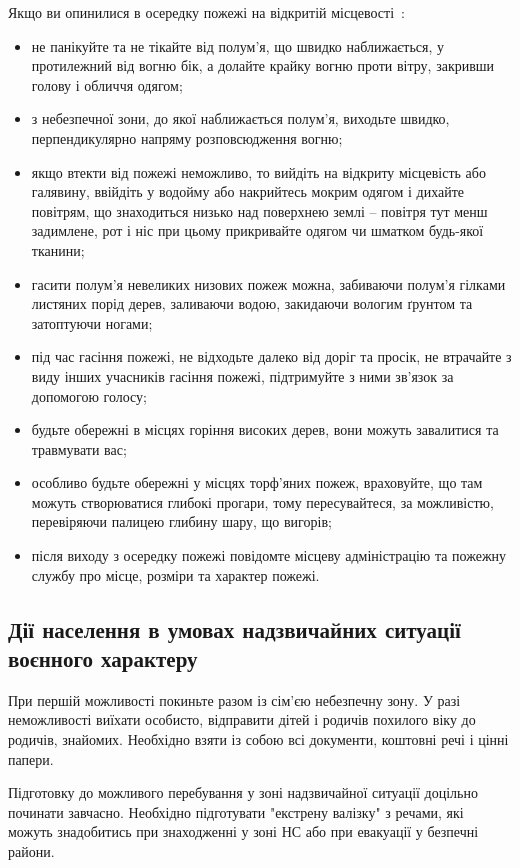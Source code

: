 Якщо ви опинилися в осередку пожежі на відкритій місцевості~\cite{cherkass}:
\begin{itemize}
	\item не панікуйте та не тікайте від полум’я, що швидко наближається, у протилежний від вогню бік, а долайте крайку вогню проти вітру, закривши голову і обличчя одягом;
	\item з небезпечної зони, до якої наближається полум’я, виходьте швидко, перпендикулярно напряму розповсюдження вогню;
	\item якщо втекти від пожежі неможливо, то вийдіть на відкриту місцевість або галявину, ввійдіть у водойму або накрийтесь мокрим одягом і дихайте повітрям, що знаходиться низько над поверхнею землі – повітря тут менш задимлене, рот і ніс при цьому прикривайте одягом чи шматком будь-якої тканини;
	\item гасити полум’я невеликих низових пожеж можна, забиваючи полум’я гілками листяних порід дерев, заливаючи водою, закидаючи вологим ґрунтом та затоптуючи ногами;
	\item під час гасіння пожежі, не відходьте далеко від доріг та просік, не втрачайте з виду інших учасників гасіння пожежі, підтримуйте з ними зв’язок за допомогою голосу;
	\item будьте обережні в місцях горіння високих дерев, вони можуть завалитися та травмувати вас;
	\item особливо будьте обережні у місцях торф’яних пожеж, враховуйте, що там можуть створюватися глибокі прогари, тому пересувайтеся, за можливістю, перевіряючи палицею глибину шару, що вигорів;
	\item після виходу з осередку пожежі повідомте місцеву адміністрацію та пожежну службу про місце, розміри та характер пожежі.
\end{itemize}

\subsection{Дії населення в умовах надзвичайних ситуації воєнного характеру}
При першій можливості покиньте разом із сім’єю небезпечну зону. У разі неможливості виїхати особисто, відправити дітей і родичів похилого віку до родичів, знайомих. Необхідно взяти із собою всі документи, коштовні речі і цінні папери.

Підготовку до можливого перебування у зоні надзвичайної ситуації доцільно починати завчасно. Необхідно підготувати "екстрену валізку" з речами, які можуть знадобитись при знаходженні у зоні НС або при евакуації у безпечні райони.
 
